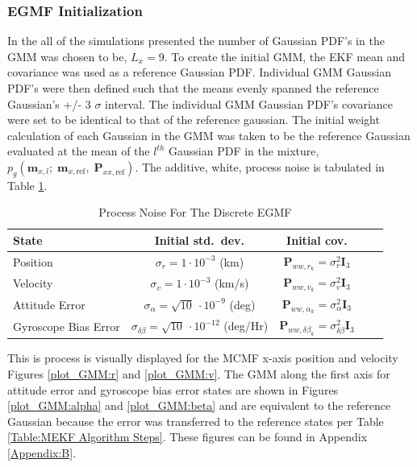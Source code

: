 \documentclass[conf]{new-aiaa}
\newcommand{\vect}[1]{\mathbf{#1}}
\newcommand{\mat}[1]{\mathbf{#1}}
\begin{document}
\subsubsection{EGMF Initialization}
In the all of the simulations presented the number of Gaussian PDF's in the GMM was chosen to be, $L_x = 9$. To create the initial GMM, the EKF mean and covariance was used as a reference Gaussian PDF. Individual GMM Gaussian PDF's were then defined such that the means evenly spanned the reference Gaussian's +/- 3 $\sigma$ interval. The individual GMM Gaussian PDF's covariance were set to be identical to that of the reference gaussian. The initial weight calculation of each Gaussian in the GMM was taken to be the reference Gaussian evaluated at the mean of the $l^{th}$ Gaussian PDF in the mixture, $p_g( \vect{m}_{x,l};\; \vect{m}_{x,{\text{ref}}},\; \mat{P}_{xx,\text{ref}} )$. The additive, white, process noise is tabulated in Table \ref{tab:EGMF_init_sigmas_psd}.

\begin{table}[h!]
\centering
\caption{Process Noise For The Discrete EGMF}
\label{tab:EGMF_init_sigmas_psd}
\begin{tabular}{l c c c c}
\hline
\textbf{State} & \textbf{Initial std.\ dev.} & \textbf{Initial cov.}  \\
\hline
Position & $\sigma_{r} = 1 \cdot10^{-3}$ (km) & $\mat{P}_{ww,r_k} = \sigma_{r}^{2}\mat{I}_3$ \\

Velocity & $\sigma_{v} = 1 \cdot10^{-3}$ (km/s) & $\mat{P}_{ww,v_k} = \sigma_{v}^{2}\mat{I}_3$  \\[6pt]

Attitude Error  & $\sigma_{\alpha} = \sqrt{10}\ \cdot10^{-9}$ (deg) & $\mat{P}_{ww,\alpha_k} = \sigma_{\alpha}^{2}\mat{I}_3$   \\[6pt]

Gyroscope Bias Error & $\sigma_{\delta\beta} = \sqrt{10}\ \cdot10^{-12}$ (deg/Hr) & $\mat{P}_{ww,\delta\beta_k} = \sigma_{\delta\beta}^{2}\mat{I}_3$  \\
\hline
\end{tabular}
\end{table}

This is process is visually displayed for the MCMF x-axis position and velocity Figures \ref{plot_GMM:r} and \ref{plot_GMM:v}. The GMM along the first axis for attitude error and gyroscope bias error states are shown in Figures \ref{plot_GMM:alpha} and \ref{plot_GMM:beta} and are equivalent to the reference Gaussian because the error was transferred to the reference states per Table \ref{Table:MEKF Algorithm Steps}. These figures can be found in Appendix \ref{Appendix:B}.
\end{document}
